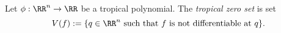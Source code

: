 

    Let $\phi: \RR^n\to \RR$ be a tropical polynomial. The \emph{tropical zero set} is set 
    \[V(f):=\{q\in \RR^n \text{ such that $f$ is not differentiable at $q$}\}.\]

